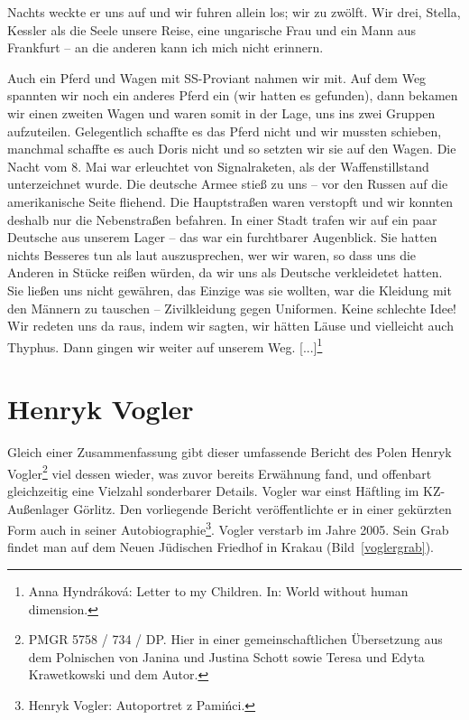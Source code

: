 Nachts weckte er uns auf und wir fuhren allein los; wir zu zwölft. Wir drei, Stella, Kessler als die Seele unsere Reise, eine ungarische Frau und ein Mann aus Frankfurt -- an die anderen kann ich mich nicht erinnern. 

Auch ein Pferd und Wagen mit SS-Proviant nahmen wir mit. Auf dem Weg spannten wir noch ein anderes Pferd ein (wir hatten es gefunden), dann bekamen wir einen zweiten Wagen und waren somit in der Lage, uns ins zwei Gruppen aufzuteilen. Gelegentlich schaffte es das Pferd nicht und wir mussten schieben, manchmal schaffte es auch Doris nicht und so setzten wir sie auf den Wagen. Die Nacht vom 8. Mai war erleuchtet von Signalraketen, als der Waffenstillstand unterzeichnet wurde. Die deutsche Armee stieß zu uns -- vor den Russen auf die amerikanische Seite fliehend. Die Hauptstraßen waren verstopft und wir konnten deshalb nur die Nebenstraßen befahren. In einer Stadt trafen wir auf ein paar Deutsche aus unserem Lager -- das war ein furchtbarer Augenblick. Sie hatten nichts Besseres tun als laut auszusprechen, wer wir waren, so dass uns die Anderen in Stücke reißen würden, da wir uns als Deutsche verkleidetet hatten. Sie ließen uns nicht gewähren, das Einzige was sie wollten, war die Kleidung mit den Männern zu tauschen -- Zivilkleidung gegen Uniformen. Keine schlechte Idee! Wir redeten uns da raus, indem wir sagten, wir hätten Läuse und vielleicht auch Thyphus. Dann gingen wir weiter auf unserem Weg. [...]\footnote{Anna Hyndr\'akov\'a: Letter to my Children. In: World without human dimension.}


\section*{Henryk Vogler}\label{vogler}
Gleich einer Zusammenfassung gibt dieser umfassende Bericht des Polen Henryk Vogler\footnote{PMGR 5758 / 734 / DP. Hier in einer gemeinschaftlichen Übersetzung aus dem Polnischen von Janina und Justina Schott sowie Teresa und Edyta Krawetkowski und dem Autor.} viel dessen wieder, was zuvor bereits Erwähnung fand, und offenbart gleichzeitig eine Vielzahl sonderbarer Details. Vogler war einst Häftling im KZ-Außenlager Görlitz. Den vorliegende Bericht veröffentlichte er in einer gekürzten Form auch in seiner Autobiographie\footnote{Henryk Vogler: Autoportret z Pamińci.}. Vogler verstarb im Jahre 2005. Sein Grab findet man auf dem Neuen Jüdischen Friedhof in Krakau (Bild~\ref{voglergrab}).  




